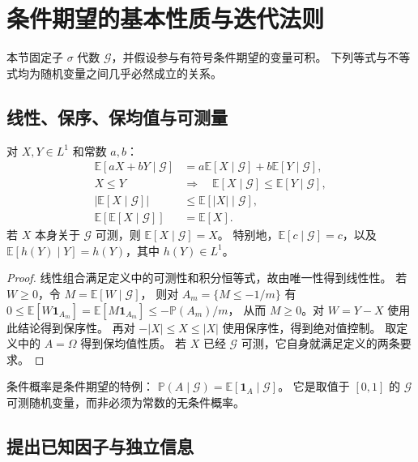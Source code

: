 \documentclass[UTF8]{ctexart}
\begin{document}
\section{条件期望的基本性质与迭代法则}
\label{sec:conditional-properties}

本节固定子 $\sigma$ 代数 $\mathcal G$，并假设参与有符号条件期望的变量可积。
下列等式与不等式均为随机变量之间几乎必然成立的关系。

\subsection{线性、保序、保均值与可测量}

\begin{proposition}[基本运算性质]
\label{prop:conditional-basic}
对 $X,Y\in L^1$ 和常数 $a,b$：
\begin{align}
  \mathbb E[aX+bY\mid\mathcal G]
    &=a\mathbb E[X\mid\mathcal G]+b\mathbb E[Y\mid\mathcal G],
    \label{eq:conditional-linearity}\\
  X\leq Y\quad&\Longrightarrow\quad
    \mathbb E[X\mid\mathcal G]\leq\mathbb E[Y\mid\mathcal G],
    \label{eq:conditional-order}\\
  |\mathbb E[X\mid\mathcal G]|
    &\leq\mathbb E[|X|\mid\mathcal G],
    \label{eq:conditional-absolute}\\
  \mathbb E[\mathbb E[X\mid\mathcal G]]
    &=\mathbb E[X].
    \label{eq:conditional-total}
\end{align}
若 $X$ 本身关于 $\mathcal G$ 可测，则 $\mathbb E[X\mid\mathcal G]=X$。
特别地，$\mathbb E[c\mid\mathcal G]=c$，以及
$\mathbb E[h(Y)\mid Y]=h(Y)$，其中 $h(Y)\in L^1$。
\end{proposition}

\begin{proof}
线性组合满足定义中的可测性和积分恒等式，故由唯一性得到线性性。
若 $W\geq0$，令 $M=\mathbb E[W\mid\mathcal G]$，
则对 $A_m=\{M\leq-1/m\}$ 有
$0\leq\mathbb E[W\mathbf1_{A_m}]
=\mathbb E[M\mathbf1_{A_m}]\leq-\mathbb P(A_m)/m$，
从而 $M\geq0$。对 $W=Y-X$ 使用此结论得到保序性。
再对 $-|X|\leq X\leq|X|$ 使用保序性，得到绝对值控制。
取定义中的 $A=\Omega$ 得到保均值性质。
若 $X$ 已经 $\mathcal G$ 可测，它自身就满足定义的两条要求。
\end{proof}

条件概率是条件期望的特例：
$\mathbb P(A\mid\mathcal G)=\mathbb E[\mathbf1_A\mid\mathcal G]$。
它是取值于 $[0,1]$ 的 $\mathcal G$ 可测随机变量，而非必须为常数的无条件概率。

\subsection{提出已知因子与独立信息}
\end{document}
